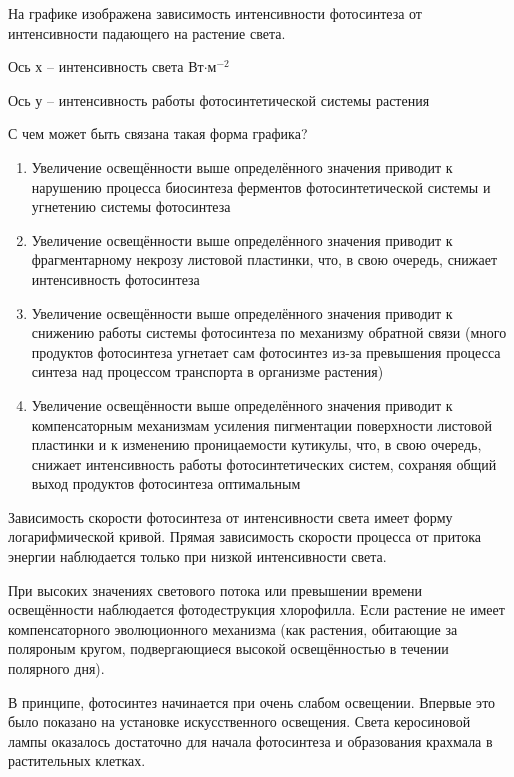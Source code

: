 
На графике изображена зависимость интенсивности фотосинтеза от интенсивности падающего на растение света.


Ось х – интенсивность света Вт$\cdot$м$^{-2}$

Ось у – интенсивность работы фотосинтетической системы растения

С чем может быть связана такая форма графика?

\begin{enumerate}
    \item Увеличение освещённости выше определённого значения приводит к нарушению процесса биосинтеза ферментов фотосинтетической системы и угнетению системы фотосинтеза
    \item Увеличение освещённости выше определённого значения приводит к фрагментарному некрозу листовой пластинки, что, в свою очередь, снижает интенсивность фотосинтеза
    \item Увеличение освещённости выше определённого значения приводит к снижению работы системы фотосинтеза по механизму обратной связи (много продуктов фотосинтеза угнетает сам фотосинтез из-за превышения процесса синтеза над процессом транспорта в организме растения)
    \item Увеличение освещённости выше определённого значения приводит к компенсаторным механизмам усиления пигментации поверхности листовой пластинки и к изменению проницаемости кутикулы, что, в свою очередь, снижает интенсивность работы фотосинтетических систем, сохраняя общий выход продуктов фотосинтеза оптимальным
\end{enumerate}

\explanationSection

Зависимость скорости фотосинтеза от интенсивности света имеет форму логарифмической кривой. Прямая зависимость скорости процесса от притока энергии наблюдается только при низкой интенсивности света. 

При высоких значениях светового потока или превышении времени освещённости наблюдается фотодеструкция хлорофилла. Если растение не имеет компенсаторного эволюционного механизма (как растения, обитающие за поляроным кругом, подвергающиеся высокой освещённостью в течении полярного дня).

В принципе, фотосинтез начинается при очень слабом освещении. Впервые это было показано на установке искусственного освещения. Света керосиновой лампы оказалось достаточно для начала фотосинтеза и образования крахмала в растительных клетках. 

